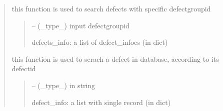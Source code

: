 \documentclass[letterpaper,10pt,english]{sphinxmanual}
\begin{document}
\begin{quote}
\begin{savenotes}
\begin{fulllineitems}
\begin{savenotes}\begin{fulllineitems}
\label{\detokenize{setting/database_utils:oxin.database_utils.dataBaseUtils.search_defect_by_group_id}}
\pysigstartsignatures
{}
\pysigstopsignatures
\sphinxAtStartPar
this function is used to search defects with specific defect\sphinxhyphen{}group\sphinxhyphen{}id
\begin{quote}\begin{description}
\sphinxAtStartPar
{} – (\_type\_) input defect\sphinxhyphen{}group\sphinxhyphen{}id

\sphinxAtStartPar
defects\_info: a list of defect\_infoes (in dict)

\end{description}\end{quote}

\end{fulllineitems}\end{savenotes}


\begin{savenotes}\begin{fulllineitems}
\label{\detokenize{setting/database_utils:oxin.database_utils.dataBaseUtils.search_defect_by_id}}
\pysigstartsignatures
{}
\pysigstopsignatures
\sphinxAtStartPar
this function is used to serach a defect in database, according to its defect\sphinxhyphen{}id
\begin{quote}\begin{description}
\sphinxAtStartPar
{} – (\_type\_) in string

\sphinxAtStartPar
defect\_info: a list with single record (in dict)

\end{description}\end{quote}

\end{fulllineitems}\end{savenotes}


\end{fulllineitems}
\end{savenotes}
\end{quote}
\end{document}
